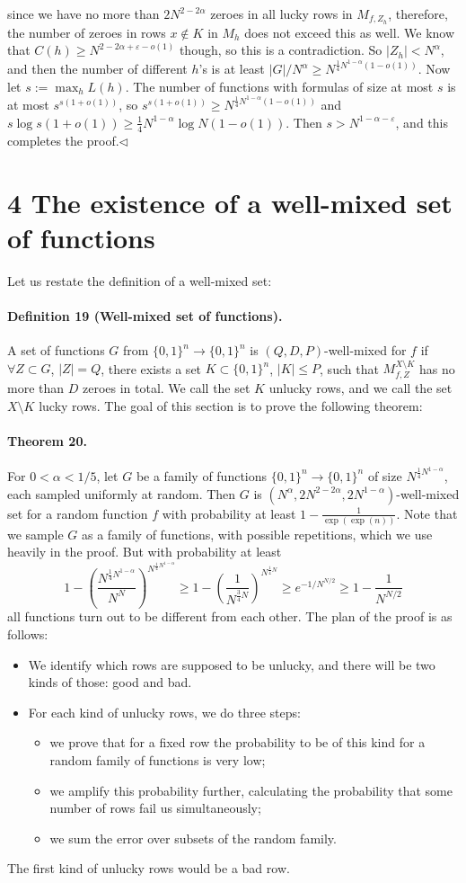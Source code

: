 \documentclass[10pt,a4paper]{article}
\begin{document}
since we have no more than $2N^{2-2\alpha}$ zeroes in all lucky rows in $M_{f,Z_h}$, therefore, the number of zeroes in rows $x\notin K$ in $M_h$ does not exceed this as well. We know that $C(h)\geq N^{2-2\alpha+\varepsilon-o(1)}$ though, so this is a contradiction.
So $|Z_h|<N^\alpha$, and then the number of different $h$'s is at least $|G|/N^\alpha\geq N^{\frac14N^{1-\alpha}(1-o(1))}$.
Now let $s:=\max_hL(h)$. The number of functions with formulas of size at most $s$ is at most $s^{s(1+o(1))}$, so $s^{s(1+o(1))}\geq N^{\frac14N^{1-\alpha}(1-o(1))}$ and $s\log s(1+o(1))\geq\frac14N^{1-\alpha}\log N(1-o(1))$. Then $s>N^{1-\alpha-\varepsilon}$, and this completes the proof.\hfill$\triangleleft$
\section*{4 The existence of a well-mixed set of functions}
Let us restate the definition of a well-mixed set:
\paragraph{Definition 19 (Well-mixed set of functions).} A set of functions $G$ from $\{0,1\}^n\to\{0,1\}^n$ is $(Q,D,P)$-well-mixed for $f$ if $\forall Z\subset G$, $|Z|=Q$, there exists a set $K\subset\{0,1\}^n$, $|K|\leq P$, such that $M_{f,Z}^{X\setminus K}$ has no more than $D$ zeroes in total. We call the set $K$ unlucky rows, and we call the set $X\setminus K$ lucky rows.
The goal of this section is to prove the following theorem:
\paragraph{Theorem 20.} For $0<\alpha<1/5$, let $G$ be a family of functions $\{0,1\}^n\to\{0,1\}^n$ of size $N^{\frac14N^{1-\alpha}}$, each sampled uniformly at random. Then $G$ is $(N^\alpha,2N^{2-2\alpha},2N^{1-\alpha})$-well-mixed set for a random function $f$ with probability at least $1-\frac1{\exp(\exp(n))}$.
Note that we sample $G$ as a family of functions, with possible repetitions, which we use heavily in the proof. But with probability at least
\[1-\left(\frac{N^{\frac14N^{1-\alpha}}}{N^N}\right)^{N^{\frac14N^{1-\alpha}}}\geq1-\left(\frac1{N^{\frac34N}}\right)^{N^{\frac14N}}\geq e^{-1/N^{N/2}}\geq1-\frac1{N^{N/2}}\]
all functions turn out to be different from each other.
The plan of the proof is as follows:
\begin{itemize}
\item We identify which rows are supposed to be unlucky, and there will be two kinds of those: good and bad.
\item For each kind of unlucky rows, we do three steps:
\begin{itemize}
\item we prove that for a fixed row the probability to be of this kind for a random family of functions is very low;
\item we amplify this probability further, calculating the probability that some number of rows fail us simultaneously;
\item we sum the error over subsets of the random family.
\end{itemize}
\end{itemize}
The first kind of unlucky rows would be a bad row.
\end{document}
